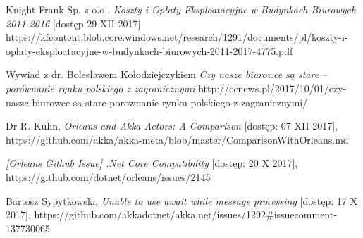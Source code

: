 \begin{thebibliography}{10}%


Knight Frank Sp. z o.o., \emph{Koszty i Opłaty Eksploatacyjne w Budynkach Biurowych 2011-2016} [dostęp 29 XII 2017] 
https://kfcontent.blob.core.windows.net/research/1291/documents/pl/koszty-i-oplaty-eksploatacyjne-w-budynkach-biurowych-2011-2017-4775.pdf

 Wywiad z dr. Bolesławem Kołodziejczykiem \emph{Czy nasze biurowce są stare – porównanie rynku polskiego z zagranicznymi}
http://ccnews.pl/2017/10/01/czy-nasze-biurowce-sa-stare-porownanie-rynku-polskiego-z-zagranicznymi/

Dr R. Kuhn, \emph{Orleans and Akka Actors: A Comparison} [dostęp: 07 XII 2017],
https://github.com/akka/akka-meta/blob/master/ComparisonWithOrleans.md

 \emph{[Orleans Github Issue] .Net Core Compatibility} [dostęp: 20 X 2017],
https://github.com/dotnet/orleans/issues/2145

 Bartosz Sypytkowski, \emph{Unable to use await while message processing} [dostęp: 17 X 2017], 
https://github.com/akkadotnet/akka.net/issues/1292\#issuecomment-137730065


\end{thebibliography}